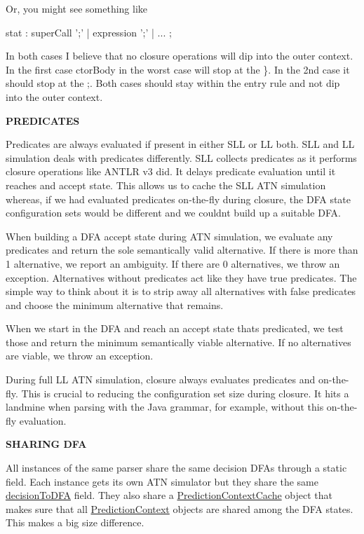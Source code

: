 Or, you might see something like


\begin{DoxyPre}
stat
  : superCall ';'
  | expression ';'
  | ...
  ;
\end{DoxyPre}


In both cases I believe that no closure operations will dip into the outer context. In the first case ctor\+Body in the worst case will stop at the \textquotesingle{}\}\textquotesingle{}. In the 2nd case it should stop at the \textquotesingle{};\textquotesingle{}. Both cases should stay within the entry rule and not dip into the outer context.

{\bfseries P\+R\+E\+D\+I\+C\+A\+T\+ES}

Predicates are always evaluated if present in either S\+LL or LL both. S\+LL and LL simulation deals with predicates differently. S\+LL collects predicates as it performs closure operations like A\+N\+T\+LR v3 did. It delays predicate evaluation until it reaches and accept state. This allows us to cache the S\+LL A\+TN simulation whereas, if we had evaluated predicates on-\/the-\/fly during closure, the D\+FA state configuration sets would be different and we couldn\textquotesingle{}t build up a suitable D\+FA.

When building a D\+FA accept state during A\+TN simulation, we evaluate any predicates and return the sole semantically valid alternative. If there is more than 1 alternative, we report an ambiguity. If there are 0 alternatives, we throw an exception. Alternatives without predicates act like they have true predicates. The simple way to think about it is to strip away all alternatives with false predicates and choose the minimum alternative that remains.

When we start in the D\+FA and reach an accept state that\textquotesingle{}s predicated, we test those and return the minimum semantically viable alternative. If no alternatives are viable, we throw an exception.

During full LL A\+TN simulation, closure always evaluates predicates and on-\/the-\/fly. This is crucial to reducing the configuration set size during closure. It hits a landmine when parsing with the Java grammar, for example, without this on-\/the-\/fly evaluation.

{\bfseries S\+H\+A\+R\+I\+NG D\+FA}

All instances of the same parser share the same decision D\+F\+As through a static field. Each instance gets its own A\+TN simulator but they share the same \hyperlink{}{decision\+To\+D\+FA} field. They also share a \hyperlink{}{Prediction\+Context\+Cache} object that makes sure that all \hyperlink{classantlr4_1_1atn_1_1PredictionContext}{Prediction\+Context} objects are shared among the D\+FA states. This makes a big size difference.

